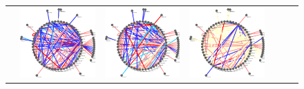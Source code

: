 \documentclass{bioinfo}
\begin{document}
\begin{figure}
\begin{tabular}{lcccccc}
&     \includegraphics[scale=0.15]{results/joint/t4.png}
&     \includegraphics[scale=0.15]{results/joint/t5.png}
&     \includegraphics[scale=0.15]{results/joint/t6.png} \\

\end{tabular}
\end{figure}
\end{document}

